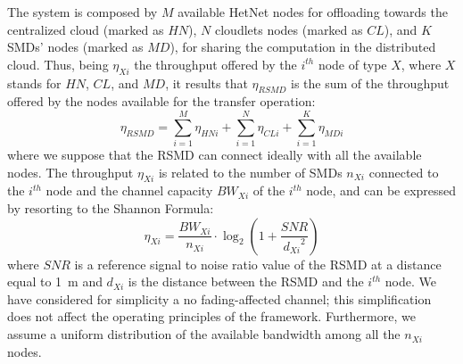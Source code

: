 \documentclass[twoside,openright]{report}
\begin{document}
The system is composed by $M$ available \gls{HetNet} nodes for offloading towards the centralized cloud (marked as $\textit{HN}$),  $N$ cloudlets nodes (marked as $\textit{CL}$), and $K$ \glspl{SMD}' nodes (marked as $\textit{MD}$), for sharing the computation in the distributed cloud.
Thus, being $\eta_\textit{Xi}$ the throughput offered by the $i^{th}$ node of type $X$, where $X$ stands for $\textit{HN}$, $\textit{CL}$, and $\textit{MD}$, it results that $\eta_\textit{RSMD}$ is the sum of the throughput offered by the nodes available for the transfer operation:
\begin{equation}
\label{eq:throughput4}
\eta_\textit{RSMD} = \sum_{i=1}^\textit{M} \eta_\textit{HNi} + \sum_{i=1}^\textit{N} \eta_\textit{CLi} + \sum_{i=1}^\textit{K} \eta_\textit{MDi}  
\end{equation}
where we suppose that the \gls{RSMD} can connect ideally with all the available nodes.  The throughput $\eta_\textit{Xi}$ is related to the number of \glspl{SMD} $n_\textit{Xi}$ connected to the $i^{th}$ node and the channel capacity $BW_\textit{Xi}$ of the $i^{th}$ node, and can be expressed by resorting to the Shannon Formula:
\begin{equation}
\eta_\textit{Xi} = \frac{\textit{BW}_\textit{Xi}}{n_\textit{Xi}}\cdot \log_2{\left(1+\frac{\textit{SNR}}{{d_\textit{Xi}}^2}\right)}
\label{eq:shannon4}
\end{equation} 
where $\textit{SNR}$ is a reference signal to noise ratio value of the \gls{RSMD} at a distance equal to 1~m and $d_\textit{Xi}$ is the distance between the \gls{RSMD} and the $i^{th}$ node. 
We have considered for simplicity a no fading-affected channel; this simplification does not affect the operating principles of the framework. Furthermore, we assume a uniform distribution of the available bandwidth among all the $n_\textit{Xi}$ nodes.
\end{document}
